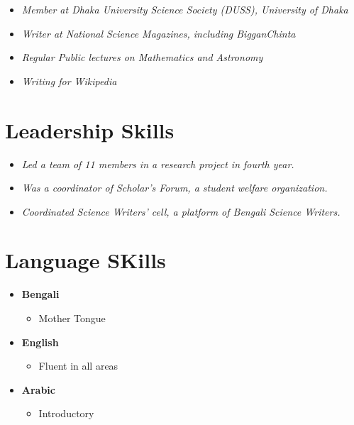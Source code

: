 \documentclass[
]{book}
\providecommand{\tightlist}{%
  \setlength{\itemsep}{0pt}\setlength{\parskip}{0pt}}
\begin{document}
\begin{itemize}
\tightlist
\item
  \emph{Member at Dhaka University Science Society (DUSS), University of Dhaka}
\item
  \emph{Writer at National Science Magazines, including BigganChinta}
\item
  \emph{Regular Public lectures on Mathematics and Astronomy}
\item
  \emph{Writing for Wikipedia}
\end{itemize}

\hypertarget{leadership-skills}{%
\section*{Leadership Skills}\label{leadership-skills}}

\begin{itemize}
\tightlist
\item
  \emph{Led a team of 11 members in a research project in fourth year.}
\item
  \emph{Was a coordinator of Scholar's Forum, a student welfare organization.}
\item
  \emph{Coordinated Science Writers' cell, a platform of Bengali Science Writers.}
\end{itemize}

\hypertarget{language-skills}{%
\section*{Language SKills}\label{language-skills}}

\begin{itemize}
\item
  \textbf{Bengali}

  \begin{itemize}
  \tightlist
  \item
    Mother Tongue
  \end{itemize}
\item
  \textbf{English}

  \begin{itemize}
  \tightlist
  \item
    Fluent in all areas
  \end{itemize}
\item
  \textbf{Arabic}

  \begin{itemize}
  \tightlist
  \item
    Introductory
  \end{itemize}
\end{itemize}

  
\end{document}
